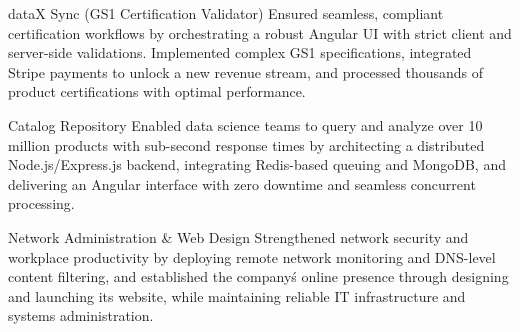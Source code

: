 \begin{sectionContainer}
	{dataX Sync (GS1 Certification Validator)} {Ensured seamless, compliant certification workflows by orchestrating a robust Angular UI with strict client and server-side validations. Implemented complex GS1 specifications, integrated Stripe payments to unlock a new revenue stream, and processed thousands of product certifications with optimal performance.}
\end{sectionContainer}

\begin{sectionContainer}
	{Catalog Repository} {Enabled data science teams to query and analyze over 10 million products with sub-second response times by architecting a distributed Node.js/Express.js backend, integrating Redis-based queuing and MongoDB, and delivering an Angular interface with zero downtime and seamless concurrent processing.}
\end{sectionContainer}


\begin{sectionContainer}
	{Network Administration \& Web Design} {Strengthened network security and workplace productivity by deploying remote network monitoring and DNS-level content filtering, and established the company\'s online presence through designing and launching its website, while maintaining reliable IT infrastructure and systems administration.}
\end{sectionContainer}
\nopagebreak[4]